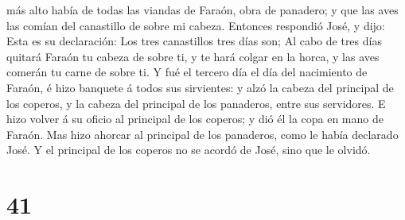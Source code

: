 más alto había de todas las viandas de Faraón, obra de panadero; y que
las aves las comían del canastillo de sobre mi cabeza. 
Entonces respondió José, y dijo: Esta es su declaración: Los tres
canastillos tres días son;  Al cabo de tres días quitará
Faraón tu cabeza de sobre ti, y te hará colgar en la horca, y las aves
comerán tu carne de sobre ti.  Y fué el tercero día el
día del nacimiento de Faraón, é hizo banquete á todos sus sirvientes: y
alzó la cabeza del principal de los coperos, y la cabeza del principal
de los panaderos, entre sus servidores.  E hizo volver á
su oficio al principal de los coperos; y dió él la copa en mano de
Faraón.  Mas hizo ahorcar al principal de los panaderos,
como le había declarado José.  Y el principal de los
coperos no se acordó de José, sino que le olvidó.

\hypertarget{section-40}{%
\section{41}\label{section-40}}


